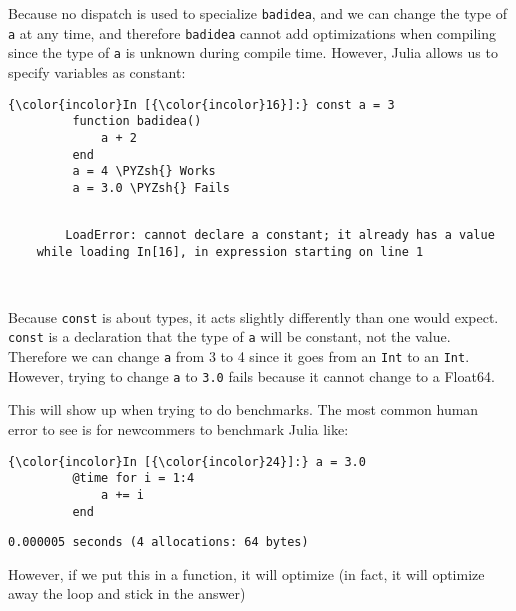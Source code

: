 \documentclass[11pt]{article}
\def\PYZsh{\char`\#}
\begin{document}
    Because no dispatch is used to specialize \texttt{badidea}, and we can
change the type of \texttt{a} at any time, and therefore
\texttt{badidea} cannot add optimizations when compiling since the type
of \texttt{a} is unknown during compile time. However, Julia allows us
to specify variables as constant:

    \begin{Verbatim}[commandchars=\\\{\}]
{\color{incolor}In [{\color{incolor}16}]:} const a = 3
         function badidea()
             a + 2
         end
         a = 4 \PYZsh{} Works
         a = 3.0 \PYZsh{} Fails
\end{Verbatim}

    \begin{Verbatim}[commandchars=\\\{\}]

        LoadError: cannot declare a constant; it already has a value
    while loading In[16], in expression starting on line 1

        

    \end{Verbatim}

    Because \texttt{const} is about types, it acts slightly differently than
one would expect. \texttt{const} is a declaration that the type of
\texttt{a} will be constant, not the value. Therefore we can change
\texttt{a} from 3 to 4 since it goes from an \texttt{Int} to an
\texttt{Int}. However, trying to change \texttt{a} to \texttt{3.0} fails
because it cannot change to a Float64.

This will show up when trying to do benchmarks. The most common human
error to see is for newcommers to benchmark Julia like:

    \begin{Verbatim}[commandchars=\\\{\}]
{\color{incolor}In [{\color{incolor}24}]:} a = 3.0
         @time for i = 1:4
             a += i
         end
\end{Verbatim}

    \begin{Verbatim}[commandchars=\\\{\}]
  0.000005 seconds (4 allocations: 64 bytes)

    \end{Verbatim}

    However, if we put this in a function, it will optimize (in fact, it
will optimize away the loop and stick in the answer)
\end{document}
